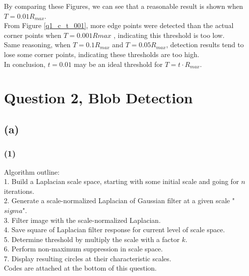 \documentclass[letterpaper]{article}
\begin{document}
By comparing these Figures, we can see that a reasonable result is shown when $T = 0.01R_{max}$.\\

From Figure \ref{q1_c_t_001}, more edge points were detected than the actual corner points when $T = 0.001R{max}$ , indicating this threshold is too low. \\
Same reasoning, when $T = 0.1R_{max}$ and $T = 0.05R_{max}$, detection results tend to lose some corner points, indicating these thresholds are too high.\\

In conclusion, $t=0.01$ may be an ideal threshold for $T = t\cdot R_{max}$.\\
\clearpage


\section*{Question 2, Blob Detection}
\subsection*{(a)}
\subsubsection*{(1)}
Algorithm outline:\\
1. Build a Laplacian scale space, starting with some initial scale and going for $n$ iterations.\\
2. Generate a scale-normalized Laplacian of Gaussian filter at a given scale "$sigma$".\\
3. Filter image with the scale-normalized Laplacian. \\
4. Save square of Laplacian filter response for current level of scale space. \\
5. Determine threshold by multiply the scale with a factor $k$. \\
6. Perform non-maximum suppression in scale space. \\
7. Display resulting circles at their characteristic scales.\\

Codes are attached at the bottom of this question.\\
\end{document}
